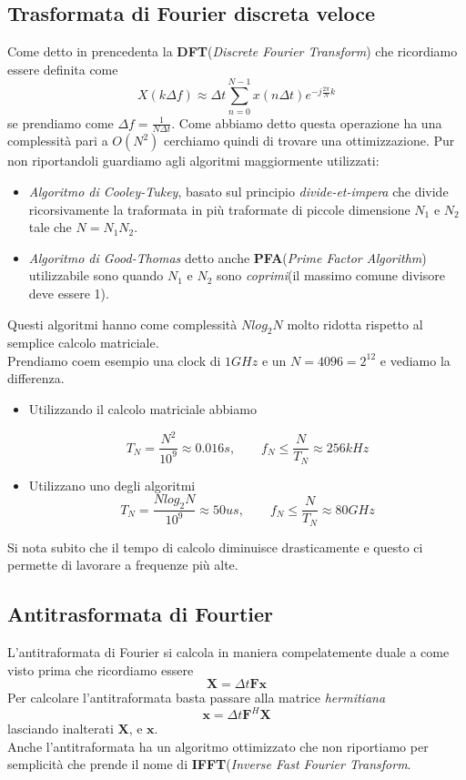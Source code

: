 \documentclass[11pt,a4paper]{article}
\begin{document}
\subsection{Trasformata di Fourier discreta veloce}
Come detto in prencedenta la \textbf{DFT}(\textit{Discrete Fourier Transform}) 
che ricordiamo essere definita come 
\[
    X(k\Delta f) \approx \Delta t \sum_{n = 0}^{N - 1} x(n\Delta t)e^{- j \frac{2 \pi}{N} k }
\]
se prendiamo come $\Delta f = \frac{1}{N \Delta t}$. 
Come abbiamo detto questa operazione ha una complessità pari a $O(N^2)$ cerchiamo 
quindi di trovare una ottimizzazione. 
Pur non riportandoli guardiamo agli algoritmi maggiormente utilizzati:
\begin{itemize}
    \item \textit{Algoritmo di Cooley-Tukey}, basato sul principio \textit{divide-et-impera}
        che divide ricorsivamente la traformata in più traformate di piccole
        dimensione $N_1$ e $N_2$ tale che $N = N_1N_2$. 
    \item \textit{Algoritmo di Good-Thomas} detto anche \textbf{PFA}(\textit{Prime Factor Algorithm})
        utilizzabile sono quando $N_1$ e $N_2$ sono \textit{coprimi}(il massimo comune divisore deve essere 1). 
\end{itemize}
Questi algoritmi hanno come complessità $Nlog_2N$ molto ridotta rispetto al 
semplice calcolo matriciale. \\ 
Prendiamo coem esempio una clock di $1GHz$ e un $N = 4096 = 2^{12}$ e vediamo la differenza. 
\begin{itemize}
    \item Utilizzando il calcolo matriciale abbiamo

        \[
            T_N = \frac{N^2}{10^9} \approx 0.016s, \quad\quad f_N \leq \frac{N}{T_N} \approx 256 kHz
        \]
    \item  Utilizzano uno degli algoritmi
        $$ 
            T_N = \frac{Nlog_2N}{10^9} \approx 50us, \quad\quad f_N \leq \frac{N}{T_N} \approx 80GHz
        $$ 
\end{itemize}
Si nota subito che il tempo di calcolo diminuisce drasticamente e questo ci permette
di lavorare a frequenze più alte.
\subsection{Antitrasformata di Fourtier}
L'antitraformata di Fourier si calcola in maniera compelatemente duale a come visto
prima che ricordiamo essere
$$
    \mathbf X = \Delta t \mathbf F \mathbf x
$$
Per calcolare l'antitraformata basta passare alla matrice \textit{hermitiana}
\[
    \mathbf x = \Delta t \mathbf F^H \mathbf X
\]
lasciando inalterati $\mathbf X$, e $\mathbf x$. \\ 
Anche l'antitraformata ha un algoritmo ottimizzato che non riportiamo per semplicità 
che prende il nome di \textbf{IFFT}(\textit{Inverse Fast Fourier Transform}.
\end{document}
